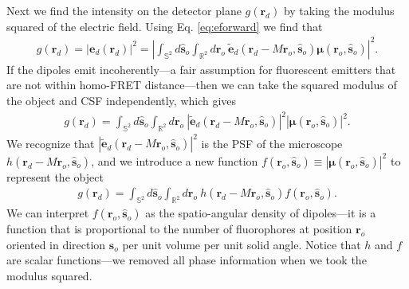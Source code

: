 \documentclass[11pt]{article}
\providecommand{\mb}[1]{\mathbf{#1}}
\providecommand{\ro}[1]{\mathbf{\mathbf{r}}_o}
\providecommand{\so}[1]{\mathbf{\hat{s}}_o}
\providecommand{\rd}[1]{\mathbf{r}_d}
\providecommand{\bs}[1]{\boldsymbol{#1}}
\begin{document}
Next we find the intensity on the detector plane $g(\rd{})$ by taking the
modulus squared of the electric field. Using Eq. \ref{eq:eforward} we find that
\begin{align}
  g(\rd{}) = |\mb{e}_d(\rd{})|^2 = \left|\int_{\mathbb{S}^2}d\so{}\int_{\mathbb{R}^2}d\ro{} \ \tilde{\mb{e}}_d(\rd{} - M\mb{r}_o, \so{})\bs{\mu}(\ro{}, \so{})\right|^2. 
\end{align}
If the dipoles emit incoherently---a fair assumption for fluorescent emitters
that are not within homo-FRET distance---then we can take the squared modulus of the
object and CSF independently, which gives
\begin{align}
  g(\rd{}) = \int_{\mathbb{S}^2}d\so{}\int_{\mathbb{R}^2}d\ro{} \ \left|\tilde{\mb{e}}_d(\rd{} - M\mb{r}_o, \so{})\right|^2\left|\bs{\mu}(\ro{}, \so{})\right|^2. 
\end{align}
We recognize that $\left|\tilde{\mb{e}}_d(\rd{} - M\mb{r}_o, \so{})\right|^2$ is
the PSF of the microscope $h(\rd{} - M\mb{r}_o, \so{})$, and
we introduce a new function
$f(\ro{}, \so{}) \equiv \left|\bs{\mu}(\ro{}, \so{})\right|^2$ to represent the object
\begin{align}
  g(\rd{}) = \int_{\mathbb{S}^2}d\so{}\int_{\mathbb{R}^2}d\ro{} \ h(\rd{} - M\mb{r}_o, \so{})f(\ro{}, \so{}).\label{eq:forwardint}
\end{align}
We can interpret $f(\ro{}, \so{})$ as the spatio-angular density of dipoles---it
is a function that is proportional to the number of fluorophores at position
$\ro{}$ oriented in direction $\so{}$ per unit volume per unit solid angle. Notice
that $h$ and $f$ are scalar functions---we removed all phase information when we took
the modulus squared. 
\end{document}
